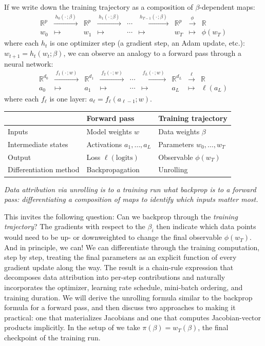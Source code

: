\documentclass[11pt]{article}
\newcommand{\R}{\mathbb{R}}
\begin{document}
If we write down the training trajectory as a composition of $\beta$-dependent maps:
\[
\begin{array}{ccccccccc}
  \R^p & \xrightarrow{\;h_0(\cdot\,;\beta)\;} & \R^p & \xrightarrow{\;h_1(\cdot\,;\beta)\;} & \cdots & \xrightarrow{\;h_{T-1}(\cdot\,;\beta)\;} & \R^p & \xrightarrow{\;\phi\;} & \R \\[4pt]
  w_0 & \longmapsto & w_1 & \longmapsto & \cdots & \longmapsto & w_T & \longmapsto & \phi(w_T)
\end{array}
\]
where each $h_t$ is one optimizer step (a gradient step, an Adam update, etc.): $w_{t+1} = h_t(w_t;\beta)$, we can observe an analogy to a forward pass through a neural network:
\[
\begin{array}{ccccccccc}
  \R^{d_0} & \xrightarrow{\;f_1(\cdot\,;w)\;} & \R^{d_1} & \xrightarrow{\;f_2(\cdot\,;w)\;} & \cdots & \xrightarrow{\;f_L(\cdot\,;w)\;} & \R^{d_L} & \xrightarrow{\;\ell\;} & \R \\[4pt]
  a_0 & \longmapsto & a_1 & \longmapsto & \cdots & \longmapsto & a_L & \longmapsto & \ell(a_L)
\end{array}
\]
where each $f_\ell$ is one layer: $a_{\ell} = f_\ell(a_{\ell-1}; w)$.
\begin{center}
\small
\begin{tabular}{lll}
\toprule
& \textbf{Forward pass } & \textbf{Training trajectory} \\
\midrule
Inputs & Model weights $w$ & Data weights $\beta$ \\
Intermediate states & Activations $a_1,\dots,a_L$ & Parameters $w_0,\dots,w_T$ \\
Output & Loss $\ell(\text{logits})$ & Observable $\phi(w_T)$ \\
Differentiation method & Backpropagation & Unrolling \\
\bottomrule
\end{tabular}
\end{center}

\noindent\emph{Data attribution via unrolling is to a training run what backprop is to a forward pass: differentiating a composition of maps to identify which inputs matter most.}


This invites the following question: Can we backprop through the \emph{training trajectory}? The gradients with respect to the $\beta_i$ then indicate which data points would need to be up- or downweighted to change the final observable $\phi(w_T)$. And in principle, we can! We can differentiate through the training computation, step by step, treating the final parameters as an explicit function of every gradient update along the way. The result is a chain-rule expression that decomposes data attribution into per-step contributions and naturally incorporates the optimizer, learning rate schedule, mini-batch ordering, and training duration. We will derive the unrolling formula similar to the backprop formula for a forward pass, and then discuss two approaches to making it practical: one that materializes Jacobians and one that computes Jacobian-vector products implicitly. In the setup of  we take $\pi(\beta)=w_T(\beta)$, the final checkpoint of the training run.
\end{document}

